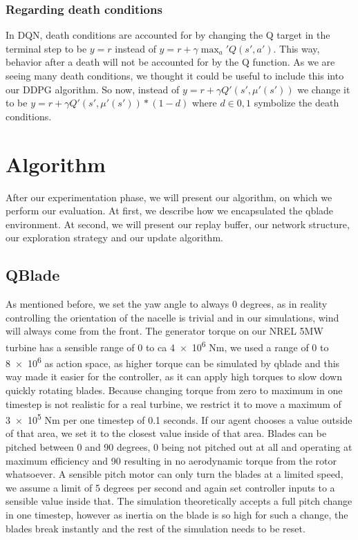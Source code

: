 \documentclass[hyperref,german,beleg]{cgvpub}
\begin{document}
\subsection{Regarding death conditions}

In \ac{DQN}, death conditions are accounted for by changing the Q target in the terminal step to be $y = r$ instead of $y = r + \gamma \max_a' Q(s', a')$. This way, behavior after a death will not be accounted for by the Q function. As we are seeing many death conditions, we thought it could be useful to include this into our DDPG algorithm. So now, instead of $y = r + \gamma Q'(s', \mu'(s'))$ we change it to be $y = r + \gamma Q'(s', \mu'(s')) * (1-d)$ where $d \in {0, 1}$ symbolize the death conditions.

\chapter{Algorithm}

After our experimentation phase, we will present our algorithm, on which we perform our evaluation. At first, we describe how we encapsulated the qblade environment. At second, we will present our replay buffer, our network structure, our exploration strategy and our update algorithm.

\section{QBlade}

\label{sec:alg_qblade}

As mentioned before, we set the yaw angle to always 0 degrees, as in reality controlling the orientation of the nacelle is trivial and in our simulations, wind will always come from the front. The generator torque on our NREL 5MW turbine has a sensible range of \num{0} to ca \num{4e6} Nm, we used a range of \num{0} to \num{8e6} as action space, as higher torque can be simulated by qblade and this way made it easier for the controller, as it can apply high torques to slow down quickly rotating blades.
Because changing torque from zero to maximum in one timestep is not realistic for a real turbine, we restrict it to move a maximum of \num{3e5} Nm per one timestep of 0.1 seconds. If our agent chooses a value outside of that area, we set it to the closest value inside of that area.
Blades can be pitched between 0 and 90 degrees, 0 being not pitched out at all and operating at maximum efficiency and 90 resulting in no aerodynamic torque from the rotor whatsoever. A sensible pitch motor can only turn the blades at a limited speed, we assume a limit of 5 degrees per second and again set controller inputs to a sensible value inside that. The simulation theoretically accepts a full pitch change in one timestep, however as inertia on the blade is so high for such a change, the blades break instantly and the rest of the simulation needs to be reset.
\end{document}
